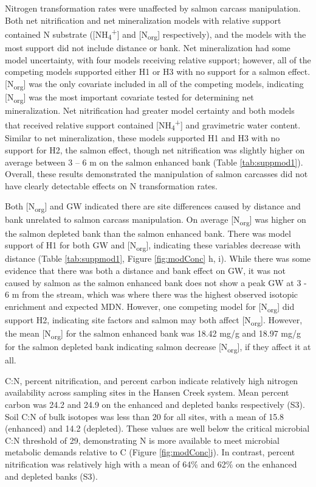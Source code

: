 \documentclass [11pt, proquest] {uwthesis}[2015/03/03]
\begin{document}
Nitrogen transformation rates were unaffected by salmon carcass
manipulation. Both net nitrification and net mineralization models with
relative support contained N substrate
({[}NH\textsubscript{4}\textsuperscript{+}{]} and
{[}N\textsubscript{org}{]} respectively), and the models with the most
support did not include distance or bank. Net mineralization had some
model uncertainty, with four models receiving relative support; however,
all of the competing models supported either H1 or H3 with no support
for a salmon effect. {[}N\textsubscript{org}{]} was the only covariate
included in all of the competing models, indicating
{[}N\textsubscript{org}{]} was the most important covariate tested for
determining net mineralization. Net nitrification had greater model
certainty and both models that received relative support contained
{[}NH\textsubscript{4}\textsuperscript{+}{]} and gravimetric water
content. Similar to net mineralization, these models supported H1 and H3
with no support for H2, the salmon effect, though net nitrification was
slightly higher on average between 3 -- 6 m on the salmon enhanced bank
(Table \ref{tab:suppmod1}). Overall, these results demonstrated the
manipulation of salmon carcasses did not have clearly detectable effects
on N transformation rates.

Both {[}N\textsubscript{org}{]} and GW indicated there are site
differences caused by distance and bank unrelated to salmon carcass
manipulation. On average {[}N\textsubscript{org}{]} was higher on the
salmon depleted bank than the salmon enhanced bank. There was model
support of H1 for both GW and {[}N\textsubscript{org}{]}, indicating
these variables decrease with distance (Table \ref{tab:suppmod1}, Figure
\ref{fig:modConc} h, i). While there was some evidence that there was
both a distance and bank effect on GW, it was not caused by salmon as
the salmon enhanced bank does not show a peak GW at 3 - 6 m from the
stream, which was where there was the highest observed isotopic
enrichment and expected MDN. However, one competing model for
{[}N\textsubscript{org}{]} did support H2, indicating site factors and
salmon may both affect {[}N\textsubscript{org}{]}. However, the mean
{[}N\textsubscript{org}{]} for the salmon enhanced bank was 18.42 mg/g
and 18.97 mg/g for the salmon depleted bank indicating salmon decrease
{[}N\textsubscript{org}{]}, if they affect it at all.\newline 

C:N, percent nitrification, and percent carbon indicate relatively high
nitrogen availability across sampling sites in the Hansen Creek system.
Mean percent carbon was 24.2 and 24.9 on the enhanced and depleted banks
respectively (S3). Soil C:N of bulk isotopes was less than 20 for all
sites, with a mean of 15.8 (enhanced) and 14.2 (depleted). These values
are well below the critical microbial C:N threshold of 29, demonstrating
N is more available to meet microbial metabolic demands relative to C
(Figure \ref{fig:modConc}j). In contrast, percent nitrification was
relatively high with a mean of 64\% and 62\% on the enhanced and
depleted banks (S3).
\end{document}
